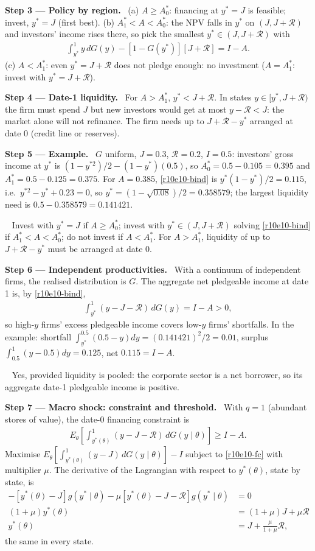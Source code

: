 \documentclass[11pt,a4paper]{article}
\newcommand{\step}[2]{\par\medskip\noindent\textbf{Step #1 --- #2.}~}
\newcommand{\answer}[1]{\par\smallskip\noindent\fbox{\textbf{Answer\if\relax\detokenize{#1}\relax\else\ #1\fi.}}~}
\newcommand{\Rc}{\mathcal{R}}
\begin{document}
\step{3}{Policy by region}
(a) $A\geq A_0^*$: financing at $y^*=J$ is feasible; invest, $y^*=J$ (first best).
(b) $A_1^*<A<A_0^*$: the NPV falls in $y^*$ on $(J,J+\Rc)$ and investors' income rises there, so pick the smallest $y^*\in(J,J+\Rc)$ with
\begin{align}
  \int_{y^*}^1y\,dG(y)-[1-G(y^*)][J+\Rc] = I-A. \label{r10e10-bind}
\end{align}
(c) $A<A_1^*$: even $y^*=J+\Rc$ does not pledge enough: no investment ($A=A_1^*$: invest with $y^*=J+\Rc$).

\step{4}{Date-1 liquidity} For $A>A_1^*$, $y^*<J+\Rc$. In states $y\in[y^*,J+\Rc)$ the firm must spend $J$ but new investors would get at most $y-\Rc<J$: the market alone will not refinance. The firm needs up to $J+\Rc-y^*$ arranged at date 0 (credit line or reserves).

\step{5}{Example} $G$ uniform, $J=0.3$, $\Rc=0.2$, $I=0.5$: investors' gross income at $y^*$ is $(1-y^{*2})/2-(1-y^*)(0.5)$, so $A_0^*=0.5-0.105=0.395$ and $A_1^*=0.5-0.125=0.375$. For $A=0.385$, \eqref{r10e10-bind} is $y^*(1-y^*)/2=0.115$, i.e.\ $y^{*2}-y^*+0.23=0$, so $y^*=(1-\sqrt{0.08})/2=0.358579$; the largest liquidity need is $0.5-0.358579=0.141421$.

\answer{(ii)} Invest with $y^*=J$ if $A\geq A_0^*$; invest with $y^*\in(J,J+\Rc)$ solving \eqref{r10e10-bind} if $A_1^*<A<A_0^*$; do not invest if $A<A_1^*$. For $A>A_1^*$, liquidity of up to $J+\Rc-y^*$ must be arranged at date 0.

\step{6}{Independent productivities} With a continuum of independent firms, the realised distribution is $G$. The aggregate net pledgeable income at date 1 is, by \eqref{r10e10-bind},
\begin{align}
  \int_{y^*}^1(y-J-\Rc)\,dG(y) = I-A>0, \label{r10e10-agg}
\end{align}
so high-$y$ firms' excess pledgeable income covers low-$y$ firms' shortfalls. In the example: shortfall $\int_{y^*}^{0.5}(0.5-y)dy=(0.141421)^2/2=0.01$, surplus $\int_{0.5}^1(y-0.5)dy=0.125$, net $0.115=I-A$.

\answer{(iii)} Yes, provided liquidity is pooled: the corporate sector is a net borrower, so its aggregate date-1 pledgeable income is positive.

\step{7}{Macro shock: constraint and threshold} With $q=1$ (abundant stores of value), the date-0 financing constraint is
\begin{align}
  E_\theta\left[\int_{y^*(\theta)}^1(y-J-\Rc)\,dG(y\mid\theta)\right]\geq I-A. \label{r10e10-fc}
\end{align}
Maximise $E_\theta[\int_{y^*(\theta)}^1(y-J)\,dG(y\mid\theta)]-I$ subject to \eqref{r10e10-fc} with multiplier $\mu$. The derivative of the Lagrangian with respect to $y^*(\theta)$, state by state, is
\begin{align}
  -[y^*(\theta)-J]g(y^*\mid\theta)-\mu[y^*(\theta)-J-\Rc]g(y^*\mid\theta) &= 0 \nonumber\\
  (1+\mu)y^*(\theta) &= (1+\mu)J+\mu\Rc \nonumber\\
  y^*(\theta) &= J+\frac{\mu}{1+\mu}\Rc, \label{r10e10-ystar}
\end{align}
the same in every state.
\end{document}
